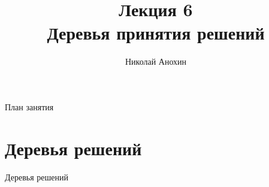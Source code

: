\documentclass[aspectratio=169]{beamer}
\author{Николай Анохин}
\title{\newline \newline \newline Лекция 6 \\ Деревья принятия решений}
\let\otp\titlepage
\renewcommand{\titlepage}{\otp\addtocounter{framenumber}{-1}}
\begin{document}
\begin{frame}[plain]
\titlepage
\end{frame}

\begin{frame}{План занятия}
\tableofcontents
\end{frame}

\section{Деревья решений}

\begin{frame}{}

\begin{center}
\Large Деревья решений
\end{center}

\end{frame}
\end{document}
